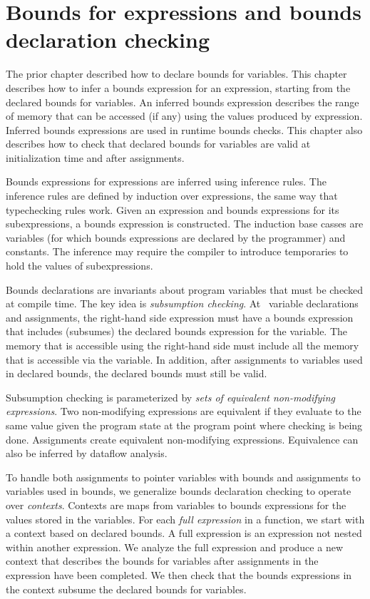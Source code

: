 
\chapter{Bounds for expressions and bounds declaration checking}
\label{chapter:checking-bounds}

The prior chapter described how to declare bounds for variables.
This chapter describes how to infer a bounds expression for 
an expression, starting from the declared bounds for variables.
An inferred bounds expression
describes the range of memory that can be accessed (if any) using 
the values produced by expression.  Inferred bounds expressions
are used in runtime bounds checks.   This chapter also describes how to
 check that declared bounds for variables are valid at initialization
 time and after assignments.

Bounds expressions for expressions are inferred using inference
rules.  The inference rules are defined by induction over expressions, 
the same way that typechecking rules work.  Given an expression
and bounds expressions for its subexpressions, a bounds expression
is constructed.  The induction base casses are variables (for which
bounds expressions are declared by the programmer) and constants.
The inference may require the compiler to introduce temporaries to
hold the values of subexpressions.

Bounds declarations are invariants about program variables
that must be checked at compile time.  The key idea is {\em subsumption checking}.
At \arrayptr\ variable declarations and assignments, 
the right-hand side expression must have a bounds expression that includes (subsumes) 
the declared bounds  expression for the variable.  The memory that is accessible using
the right-hand side must include all the memory that is accessible via the variable.
In addition, after assignments to variables used in declared bounds, the
declared bounds must still be valid.

Subsumption checking is parameterized by {\it sets of equivalent non-modifying expressions}.
Two non-modifying expressions are equivalent if they
evaluate to the same value given the program state at the program point where 
checking is being done.  Assignments create equivalent non-modifying
expressions. Equivalence can also be inferred by dataflow analysis.

To handle both assignments to pointer variables with bounds and assignments
to variables used in bounds, we generalize bounds declaration
checking to operate over {\em contexts}.  Contexts are maps from variables
to bounds expressions for the values stored in the variables.
For each {\em full expression} in a function, we start with a context based
on declared bounds.
A full expression \cite[Annex C]{ISO2011} is an expression not nested within another expression.
We analyze the full expression and produce a new
context that describes the bounds for variables after assignments
in the expression have been completed.  We then check that the bounds
expressions in the context subsume the declared bounds for variables.

